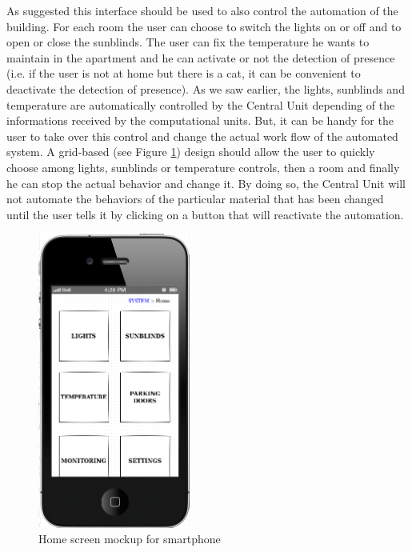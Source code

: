 \documentclass{acm_proc_article-sp}
\begin{document}
As suggested this interface should be used to also control the automation of the building.
For each room the user can choose to switch the lights on or off and to open or close the sunblinds.
The user can fix the temperature he wants to maintain in the apartment and he can activate or not the detection of presence (i.e. if the user is not at home but there is a cat, it can be convenient to deactivate the detection of presence).
As we saw earlier, the lights, sunblinds and temperature are automatically controlled by the Central Unit depending of the informations received by the computational units. But, it can be handy for the user to take over this control and change the actual work flow of the automated system.
A grid-based (see Figure \ref{mockup2}) design should allow the user to quickly choose among lights, sunblinds or temperature controls, then a room and finally he can stop the actual behavior and change it. By doing so, the Central Unit will not automate the behaviors of the particular material that has been changed until the user tells it by clicking on a button that will reactivate the automation.

        \begin{figure}[htb]
          \begin{center}
            \includegraphics[width=5cm]{mockup2}
            \caption{Home screen mockup for smartphone\label{mockup2}}
          \end{center}
        \end{figure}
\end{document}
